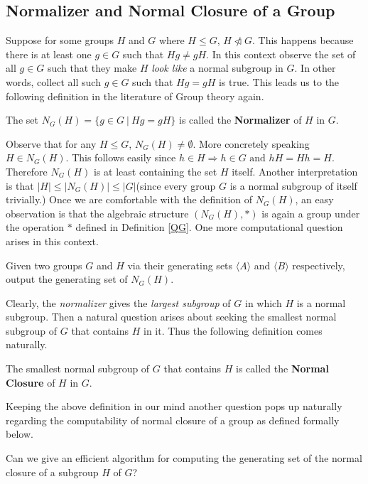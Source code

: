 \subsection{Normalizer and Normal Closure of a Group}
Suppose for some groups $H$ and $G$ where $H\leq G$, $H\ntriangleleft G$. This happens because there is at least one $g\in G$ such that $Hg\neq gH$. In this context observe the set of all $g\in G$ such that they make $H$ \emph{look like} a normal subgroup in $G$. In other words, collect all such $g\in G$ such that $Hg = gH$ is true. This leads us to the following definition in the literature of Group theory again.
\begin{definition}\label{normalizer}
	The set $N_G(H) = \{g\in G~|~Hg = gH\}$ is called the {\bf Normalizer} of $H$ in $G$.
\end{definition}
Observe that for any $H\leq G$, $N_G(H) \neq \emptyset$. More concretely speaking $H\in N_G(H)$. This follows easily since $h\in H\Longrightarrow h\in G\text{ and }hH = Hh = H$. Therefore $N_G(H)$ is at least containing the set $H$ itself. Another interpretation is that $|H|\leq |N_G(H)| \leq |G|$(since every group $G$ is a normal subgroup of itself trivially.) Once we are comfortable with the definition of $N_G(H)$, an easy observation is that the algebraic structure $(N_G(H),*)$ is again a group under the operation $*$ defined in Definition \ref{QG}. One more computational question arises in this context.
\begin{problem}\label{3}
	Given two groups $G$ and $H$ via their generating sets $\langle A\rangle$ and $\langle B\rangle$ respectively, output the generating set of $N_G(H)$.
\end{problem}
Clearly, the \emph{normalizer} gives the \emph{largest subgroup} of $G$ in which $H$ is a normal subgroup. Then a natural question arises about seeking the smallest normal subgroup of $G$ that contains $H$ in it. Thus the following definition comes naturally.
\begin{definition}
	The smallest normal subgroup of $G$ that contains $H$ is called the {\bf Normal Closure} of $H$ in $G$.
\end{definition}
Keeping the above definition in our mind another question pops up naturally regarding the computability of normal closure of a group as defined formally below.
\begin{problem}\label{4}
	Can we give an efficient algorithm for computing the generating set of the normal closure of a subgroup $H$ of $G$? 
\end{problem}

